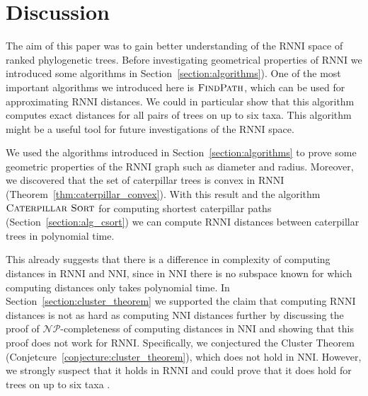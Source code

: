 \documentclass{amsart}
\newcommand{\np}{\mathcal{NP}}
\newcommand{\nni}{\mathrm{NNI}}
\newcommand{\rnni}{\mathrm{RNNI}}
\newcommand{\csort}{\textsc{Caterpillar Sort}}
\newcommand{\findpath}{\textsc{FindPath}}
\newtheorem{theorem}[definition]{Theorem}
\begin{document}
%
%
%
%
%

\section{Discussion}

The aim of this paper was to gain better understanding of the $\rnni$ space of ranked phylogenetic trees.
Before investigating geometrical properties of $\rnni$ we introduced some algorithms in Section~\ref{section:algorithms}).
One of the most important algorithms we introduced here is $\findpath$, which can be used for approximating $\rnni$ distances.
We could in particular show that this algorithm computes exact distances for all pairs of trees on up to six taxa.
This algorithm might be a useful tool for future investigations of the $\rnni$ space.

We used the algorithms introduced in Section~\ref{section:algorithms} to prove some geometric properties of the $\rnni$ graph such as diameter and radius.
Moreover, we discovered that the set of caterpillar trees is convex in $\rnni$ (Theorem~\ref{thm:caterpillar_convex}).
With this result and the algorithm $\csort$ for computing shortest caterpillar paths (Section~\ref{section:alg_csort}) we can compute $\rnni$ distances between caterpillar trees in polynomial time.

This already suggests that there is a difference in complexity of computing distances in $\rnni$ and $\nni$, since in $\nni$ there is no subspace known for which computing distances only takes polynomial time.
In Section~\ref{section:cluster_theorem} we supported the claim that computing $\rnni$ distances is not as hard as computing $\nni$ distances further by discussing the proof of $\np$-completeness of computing distances in $\nni$ and showing that this proof does not work for $\rnni$.
Specifically, we conjectured the Cluster Theorem (Conjetcure~\ref{conjecture:cluster_theorem}), which does not hold in $\nni$.
However, we strongly suspect that it holds in $\rnni$ and could prove that it does hold for trees on up to six taxa \autocite{Collienne2019}.
\end{document}
